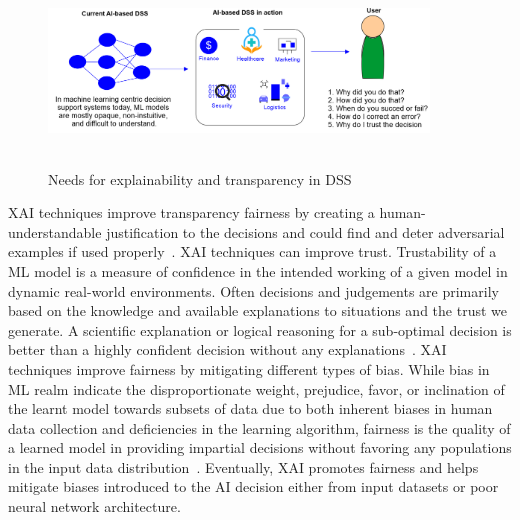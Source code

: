 \begin{figure}[h]
	\centering
	\includegraphics[width=0.9\textwidth,height=50mm]{images/why_xai.png}	
    \caption{Needs for explainability and transparency in DSS}	
	\label{fig:need_for_xai}
\end{figure}

\hspace*{3.5mm} XAI techniques improve transparency fairness by creating a human-understandable justification to the decisions and could find and deter adversarial examples if used properly~\cite{das2020opportunities}. XAI techniques can improve trust. Trustability of a ML model is a measure of confidence in the intended working of a given model in dynamic real-world environments. Often decisions and judgements are primarily based on the knowledge and available explanations to situations and the trust we generate. A scientific explanation or logical reasoning for a sub-optimal decision is better than a highly confident decision without any explanations~\cite{das2020opportunities}. XAI techniques improve fairness by mitigating different types of bias. While bias in ML realm indicate the disproportionate weight, prejudice, favor, or inclination of the learnt model towards subsets of data due to both inherent biases in human data collection and deficiencies in the learning algorithm, fairness is the quality of a learned model in providing impartial decisions without favoring any populations in the input data distribution~\cite{das2020opportunities}.
Eventually, XAI promotes fairness and helps mitigate biases introduced to the AI decision either from input datasets or poor neural network architecture.

